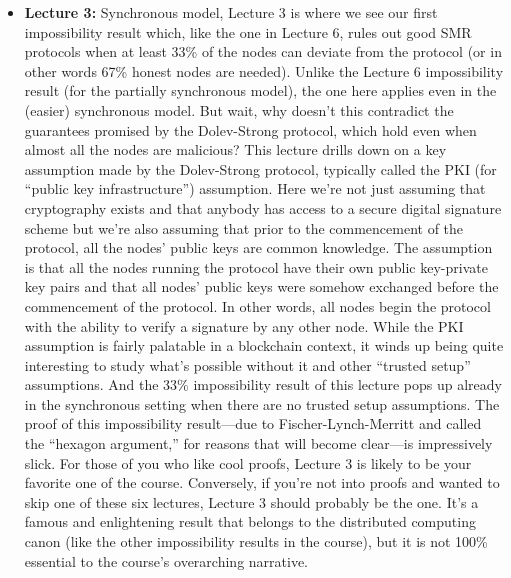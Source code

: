 \begin{itemize}
    \item \textbf{Lecture 3: }Synchronous model, Lecture 3 is where we see our first impossibility result which, like the one in Lecture 6, rules
    out good SMR protocols when at least 33\% of the nodes can deviate from the protocol (or in other words 67\% honest nodes are needed).
    Unlike the Lecture 6 impossibility result (for the partially synchronous model), the one here
    applies even in the (easier) synchronous model. But wait, why doesn’t this contradict the
    guarantees promised by the Dolev-Strong protocol, which hold even when almost all the
    nodes are malicious?
    This lecture drills down on a key assumption made by the Dolev-Strong protocol, typically
    called the PKI (for “public key infrastructure”) assumption. Here we're not just assuming that cryptography exists and that anybody has access to a secure digital signature scheme but we're also assuming that prior to the commencement of the protocol, all the nodes' public keys are common knowledge. The assumption is that all the
    nodes running the protocol have their own public key-private key pairs and that all nodes’
    public keys were somehow exchanged before the commencement of the protocol. In other
    words, all nodes begin the protocol with the ability to verify a signature by any other node.
    While the PKI assumption is fairly palatable in a blockchain context, it winds up being
    quite interesting to study what’s possible without it and other “trusted setup” assumptions.
    And the 33\% impossibility result of this lecture pops up already in the synchronous setting
    when there are no trusted setup assumptions. The proof of this impossibility result—due
    to Fischer-Lynch-Merritt and called the “hexagon argument,” for reasons that will become
    clear—is impressively slick. For those of you who like cool proofs, Lecture 3 is likely to be
    your favorite one of the course. Conversely, if you’re not into proofs and wanted to skip
    one of these six lectures, Lecture 3 should probably be the one. It’s a famous and enlightening
    result that belongs to the distributed computing canon (like the other impossibility results
    in the course), but it is not 100\% essential to the course’s overarching narrative.
    

\end{itemize}
